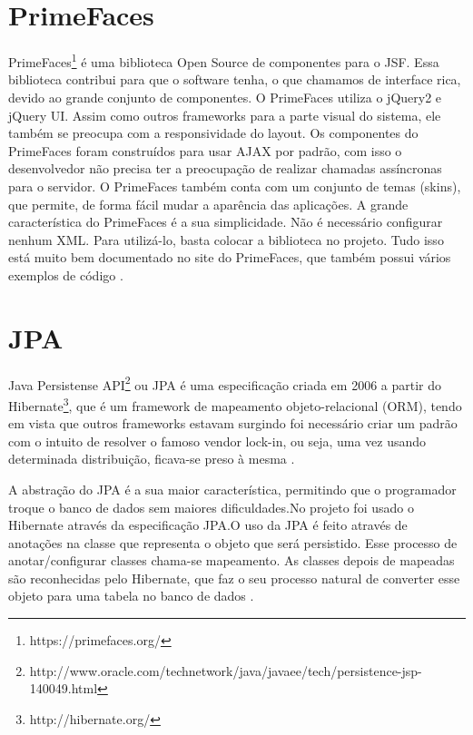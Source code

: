 \section{PrimeFaces}
\label{sec:embasamentoTeoricoPrimeFaces}

PrimeFaces\footnote{https://primefaces.org/} é uma biblioteca Open Source de componentes para o JSF. Essa biblioteca contribui para que o software tenha, o que chamamos de interface rica, devido ao grande conjunto de componentes. O PrimeFaces utiliza o jQuery2 e jQuery UI. Assim como outros frameworks para a parte visual do sistema, ele também se preocupa com a responsividade do layout.
Os componentes do PrimeFaces foram construídos para usar AJAX por padrão, com isso o desenvolvedor não precisa ter a preocupação de realizar chamadas assíncronas para o servidor. O PrimeFaces também conta com um conjunto de temas (skins), que permite, de forma fácil mudar a aparência das aplicações.
A grande característica do PrimeFaces é a sua simplicidade. Não é necessário configurar nenhum XML. Para utilizá-lo, basta colocar a biblioteca no projeto. Tudo isso está muito bem documentado no site do PrimeFaces, que também possui vários exemplos de código \cite{Civici2015}.

\section{JPA}
\label{sec:embasamentoTeoricoJPA}

Java Persistense API\footnote{ http://www.oracle.com/technetwork/java/javaee/tech/persistence-jsp-140049.html} ou JPA é uma especificação criada em 2006 a partir do Hibernate\footnote{http://hibernate.org/}, que é um framework de mapeamento objeto-relacional (ORM), tendo em vista que outros frameworks estavam surgindo foi necessário criar um padrão com o intuito de resolver o famoso vendor lock-in, ou seja, uma vez usando determinada distribuição, ficava-se preso à mesma \cite[p.~12]{Cordeiro2014}.

A abstração do JPA é a sua maior característica, permitindo que o programador troque o banco de dados sem maiores dificuldades.No projeto \imprimirtitulo \space foi usado o Hibernate através da especificação JPA.O uso da JPA é feito através de anotações na classe que representa o objeto que será persistido. Esse processo de anotar/configurar classes chama-se mapeamento. As classes depois de mapeadas são reconhecidas pelo Hibernate, que faz o seu processo natural de converter esse objeto para uma tabela no banco de dados \cite{Cordeiro2014}.